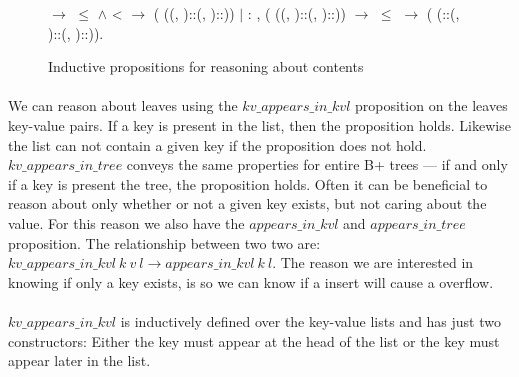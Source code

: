 \begin{figure}
\begin{coqdoccode}
  \coqdocindent{8.00em}
      \ensuremath{\rightarrow}  \ensuremath{\le}  \ensuremath{\land}  <  \ensuremath{\rightarrow}\coqdoceol
  \coqdocindent{8.00em}
     (   ((, )::(, )::))\coqdoceol
  \coqdocindent{1.00em}
  \ensuremath{|} : \coqdockw{\ensuremath{\forall}}      ,\coqdoceol
  \coqdocindent{8.00em}
     (   ((, )::(, )::)) \ensuremath{\rightarrow} \coqdoceol
  \coqdocindent{8.00em}
   \ensuremath{\le}  \ensuremath{\rightarrow}\coqdoceol
  \coqdocindent{8.00em}
     (   (::(, )::(, )::)).\coqdoceol
  \end{coqdoccode}
\caption{Inductive propositions for reasoning about contents}
\label{fig:aik_and_ait}
\end{figure}

\paragraph{}
We can reason about leaves using the $kv\_appears\_in\_kvl$ proposition on the leaves key-value pairs. If a key is present in the list, then the proposition holds. Likewise the list can not contain a given key if the proposition does not hold. $kv\_appears\_in\_tree$ conveys the same properties for entire B+ trees --- if and only if a key is present the tree, the proposition holds. Often it can be beneficial to reason about only whether or not a given key exists, but not caring about the value. For this reason we also have the $appears\_in\_kvl$ and $appears\_in\_tree$ proposition. The relationship between two two are: $kv\_appears\_in\_kvl~k~v~l \rightarrow appears\_in\_kvl~k~l$. The reason we are interested in knowing if only a key exists, is so we can know if a insert will cause a overflow.

\paragraph{}
$kv\_appears\_in\_kvl$ is inductively defined over the key-value lists and has just two constructors: Either the key must appear at the head of the list or the key must appear later in the list.


